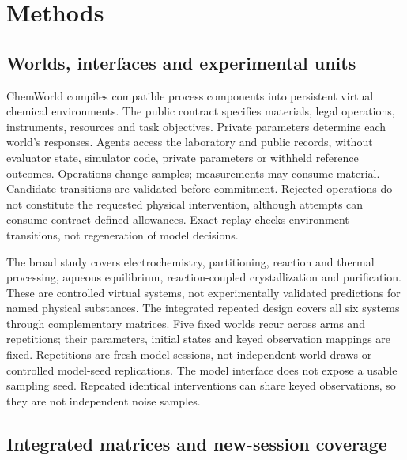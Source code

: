 \documentclass[12pt,a4paper]{article}
\begin{document}
\clearpage

\section{Methods}\label{methods}

\subsection{Worlds, interfaces and experimental units}\label{worlds-interfaces-and-experimental-units}

ChemWorld compiles compatible process components into persistent virtual chemical environments. The public contract specifies materials, legal operations, instruments, resources and task objectives. Private parameters determine each world's responses. Agents access the laboratory and public records, without evaluator state, simulator code, private parameters or withheld reference outcomes. Operations change samples; measurements may consume material. Candidate transitions are validated before commitment. Rejected operations do not constitute the requested physical intervention, although attempts can consume contract-defined allowances. Exact replay checks environment transitions, not regeneration of model decisions.

The broad study covers electrochemistry, partitioning, reaction and thermal processing, aqueous equilibrium, reaction-coupled crystallization and purification. These are controlled virtual systems, not experimentally validated predictions for named physical substances. The integrated repeated design covers all six systems through complementary matrices. Five fixed worlds recur across arms and repetitions; their parameters, initial states and keyed observation mappings are fixed. Repetitions are fresh model sessions, not independent world draws or controlled model-seed replications. The model interface does not expose a usable sampling seed. Repeated identical interventions can share keyed observations, so they are not independent noise samples.

\subsection{Integrated matrices and new-session coverage}\label{integrated-matrices-and-new-session-coverage}
\end{document}
